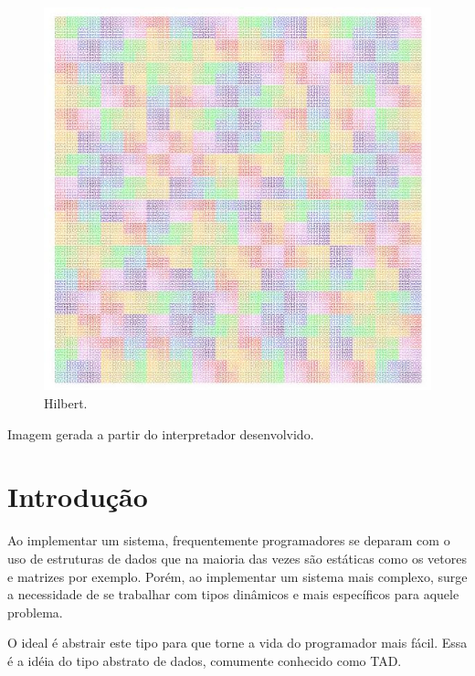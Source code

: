 \documentclass[a4paper,12pt]{article}%
\begin{document}
\begin{figure}[hb!]
\centering
\includegraphics[width=140mm]{hilbert.jpg}
\caption{Hilbert.}
\end{figure}
\hspace{1.5em}Imagem gerada a partir do interpretador desenvolvido.
\newpage






\section{Introdução} %


\hspace{1.5em}Ao implementar um sistema, frequentemente programadores se deparam com o uso de 
estruturas de dados que na maioria das vezes são estáticas como os vetores e matrizes 
por exemplo. Porém, ao implementar um sistema mais complexo, surge a necessidade de 
se trabalhar com tipos dinâmicos e mais específicos para aquele problema.
	
O ideal é abstrair este tipo para que torne a vida do programador mais fácil. Essa 
é a idéia do tipo abstrato de dados, comumente conhecido como TAD.
\end{document}
